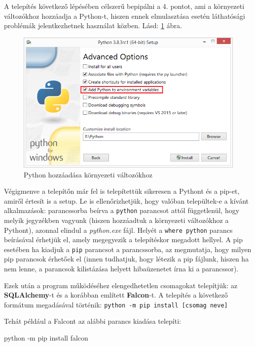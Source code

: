 A telepítés következő lépésében célszerű bepipálni a 4. pontot, ami a környezeti változókhoz hozzáadja a Python-t, hiszen ennek elmulasztása esetén láthatósági problémák jelentkezhetnek használat közben. Lásd: \ref{fig:pyt2} ábra.

\begin{figure}[h]
\centering
\includegraphics[scale=0.7]{images/python2.png}
\caption{Python hozzáadása környezeti változókhoz}
\label{fig:pyt2}
\end{figure}

Végigmenve a telepítőn már fel is telepítettük sikeresen a Pythont és a pip-et, amiről értesít is a setup. Le is ellenőrizhetjük, hogy valóban települtek-e a kívánt alkalmazások: parancssorba beírva a \texttt{python} parancsot attól függetlenül, hogy melyik jegyzékben vagyunk (hiszen hozzáadtuk a környezeti változókhoz a Pythont), azonnal elindul a \textit{python.exe} fájl. Helyét a \texttt{where python} parancs beírásával érhetjük el, amely megegyezik a telepítéskor megadott hellyel. A pip esetében ha kiadjuk a \texttt{pip} parancsot a parancssorba, az megmutatja, hogy milyen pip parancsok érhetőek el (innen tudhatjuk, hogy létezik a pip fájlunk, hiszen ha nem lenne, a parancsok kilistázása helyett hibaüzenetet írna ki a parancssor).

Ezek után a program működéséhez elengedhetetlen csomagokat telepítjük: az \textbf{SQLAlchemy}-t és a korábban említett \textbf{Falcon}-t. A telepítés a következő formátum megadásával történik: \texttt{python -m pip install [csomag neve]}

Tehát például a Falcont az alábbi parancs kiadása telepíti:

\begin{python}
python -m pip install falcon
\end{python}

